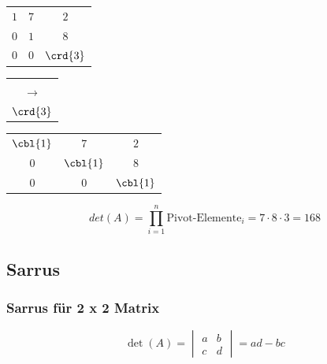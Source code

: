 \begin{minipage}[t]{0.16\columnwidth}
\centering
\renewcommand{\arraystretch}{1.4}
	\begin{tabular}{|c c c|}
		\hline
		$1$ & $7$ & $2$ \\
		$0$ & $1$ & $8$ \\
		$0$ & $0$ & $\crd{3}$ \\
		\hline
	\end{tabular}
\end{minipage}
\begin{minipage}[t]{0.045\columnwidth}
\centering
	\begin{tabular}{c}
		\\\\
		$\rightarrow$\\[1.8em]
		$\crd{3}$
	\end{tabular}
\end{minipage}
\begin{minipage}[t]{0.2\columnwidth}
\centering
\renewcommand{\arraystretch}{1.4}
	\begin{tabular}{|c c c|}
		\hline
		$\cbl{1}$ 	& $7$ 		& $2$ \\
		$0$ 		& $\cbl{1}$ & $8$ \\
		$0$ 		& $0$ 		& $\cbl{1}$ \\
		\hline
	\end{tabular}
\end{minipage}
\vspace{0.5em}
\[ 
	det(A) = \prod_{i=1}^{n} \text{Pivot-Elemente}_i = 7 \cdot 8 \cdot 3 = 168
\]


\subsection{Sarrus}

\subsubsection{Sarrus für 2 x 2 Matrix}

\vspace{-0.2cm}
$$\det(A) = 
\begin{vmatrix}
	a & b \\
	c & d
\end{vmatrix}
=  ad - bc$$
			

